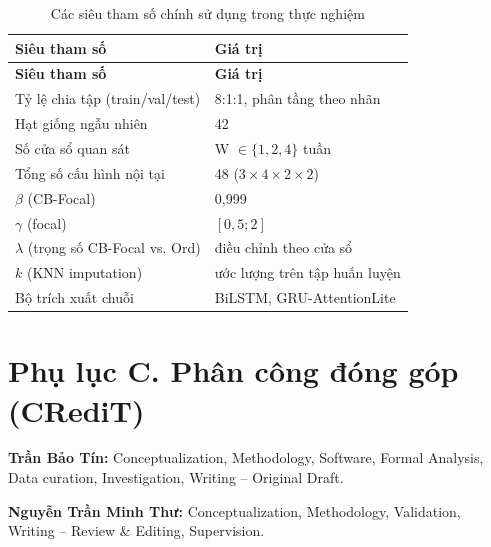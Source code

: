 \renewcommand{\arraystretch}{1.25}
\renewcommand{\thetable}{B.1}
\small
\begin{longtable}{@{}p{5cm} p{6cm}@{}}
\caption{Các siêu tham số chính sử dụng trong thực nghiệm}\\
\toprule
\textbf{Siêu tham số} & \textbf{Giá trị} \\
\midrule
\endfirsthead
\toprule
\textbf{Siêu tham số} & \textbf{Giá trị} \\
\midrule
\endhead
\bottomrule
\endfoot
Tỷ lệ chia tập (train/val/test) & 8:1:1, phân tầng theo nhãn \\
Hạt giống ngẫu nhiên & 42 \\
Số cửa sổ quan sát & W $\in \{1, 2, 4\}$ tuần \\
Tổng số cấu hình nội tại & 48 ($3 \times 4 \times 2 \times 2$) \\
$\beta$ (CB-Focal) & 0,999 \\
$\gamma$ (focal) & $[0{,}5; 2]$ \\
$\lambda$ (trọng số CB-Focal vs. Ord) & điều chỉnh theo cửa sổ \\
$k$ (KNN imputation) & ước lượng trên tập huấn luyện \\
Bộ trích xuất chuỗi & BiLSTM, GRU-AttentionLite \\
\bottomrule
\end{longtable}

\section*{Phụ lục C. Phân công đóng góp (CRediT)}

\noindent\textbf{Trần Bảo Tín:} Conceptualization, Methodology, Software, Formal Analysis, Data curation, Investigation, Writing -- Original Draft.

\noindent\textbf{Nguyễn Trần Minh Thư:} Conceptualization, Methodology, Validation, Writing -- Review \& Editing, Supervision.
